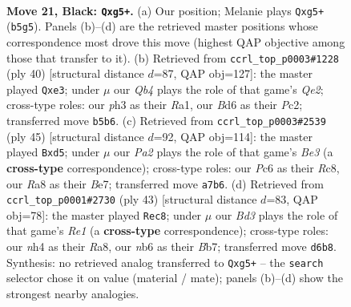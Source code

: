 \documentclass[11pt]{article}
\begin{document}
\clearpage

\begin{figure}[p]\centering
\begin{subfigure}{0.46\textwidth}\centering
\resizebox{\linewidth}{!}{%
\newchessgame
\chessboard[
  setfen={r6r/p2nk2p/1Npbp1p1/1q4P1/1p1P3N/P3P2P/1P6/R1BQ1RK1 b - - 0 21},
  showmover=false,
  pgfstyle=straightmove, color=movearrow, markmove={b5-g5}
]}
\caption{}
\end{subfigure}\hfill
\begin{subfigure}{0.46\textwidth}\centering
\resizebox{\linewidth}{!}{%
\newchessgame
\chessboard[
  setfen={2rqr1k1/1p1nbpp1/p2p4/P2Np3/4P1Pp/4n2P/1PP1QPB1/R2R2K1 w - - 0 21},
  showmover=false,
  pgfstyle=straightmove, color=movearrow, markmove={e2-e3}
]}
\caption{}
\end{subfigure}
\\[4pt]
\begin{subfigure}{0.46\textwidth}\centering
\resizebox{\linewidth}{!}{%
\newchessgame
\chessboard[
  setfen={2r4k/1p2b2p/p2pbrp1/3Np3/2q1P2P/PN3P2/1PP3Q1/1K1R2R1 b - - 1 23},
  showmover=false,
  pgfstyle=straightmove, color=movearrow, markmove={e6-d5}
]}
\caption{}
\end{subfigure}\hfill
\begin{subfigure}{0.46\textwidth}\centering
\resizebox{\linewidth}{!}{%
\newchessgame
\chessboard[
  setfen={r3r1k1/pb3pp1/7p/B1N4q/1p2n2P/3QPR2/PP3PP1/2R1KB2 b - - 0 22},
  showmover=false,
  pgfstyle=straightmove, color=movearrow, markmove={e8-c8}
]}
\caption{}
\end{subfigure}
\caption{\textbf{Move 21, Black: \texttt{Qxg5+}.} (a) Our position; Melanie plays \texttt{Qxg5+} (\texttt{b5g5}). Panels (b)--(d) are the retrieved master positions whose correspondence most drove this move (highest QAP objective among those that transfer to it). (b) Retrieved from \texttt{ccrl\_top\_p0003\#1228} (ply 40) [structural distance $d$=87, QAP obj=127]: the master played \texttt{Qxe3}; under $\mu$ our \emph{Qb4} plays the role of that game's \emph{Qe2}; cross-type roles: our \emph{p}h3 as their \emph{R}a1, our \emph{B}d6 as their \emph{P}c2; transferred move \texttt{b5b6}. (c) Retrieved from \texttt{ccrl\_top\_p0003\#2539} (ply 45) [structural distance $d$=92, QAP obj=114]: the master played \texttt{Bxd5}; under $\mu$ our \emph{Pa2} plays the role of that game's \emph{Be3} (a \textbf{cross-type} correspondence); cross-type roles: our \emph{P}c6 as their \emph{R}c8, our \emph{R}a8 as their \emph{B}e7; transferred move \texttt{a7b6}. (d) Retrieved from \texttt{ccrl\_top\_p0001\#2730} (ply 43) [structural distance $d$=83, QAP obj=78]: the master played \texttt{Rec8}; under $\mu$ our \emph{Bd3} plays the role of that game's \emph{Re1} (a \textbf{cross-type} correspondence); cross-type roles: our \emph{n}h4 as their \emph{R}a8, our \emph{n}b6 as their \emph{B}b7; transferred move \texttt{d6b8}. Synthesis: no retrieved analog transferred to \texttt{Qxg5+} -- the \texttt{search} selector chose it on value (material / mate); panels (b)--(d) show the strongest nearby analogies.}
\label{fig:thought-m41}
\end{figure}
\end{document}
